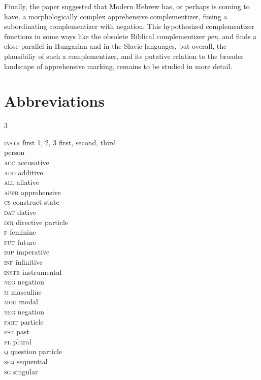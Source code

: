 \documentclass[output=paper,colorlinks,citecolor=brown]{langscibook}
\begin{document}
Finally, the paper suggested that Modern Hebrew has, or perhaps is coming to have, a morphologically complex apprehensive complementizer, fusing a subordinating complementizer with negation. This hypothesized complementizer functions in some ways like the obsolete Biblical complementizer \textit{pen}, and finds a close parallel in Hungarian and in the Slavic languages, but overall, the plausibiliy of such a complementizer, and its putative relation to the broader landscape of apprehensive marking, remains to be studied in more detail. 


\section*{Abbreviations}
\begin{multicols}{3}
\begin{tabbing}
\textsc{instr} \= first\kill
\textsc{1, 2, 3} \> first, second, third \\
\> person \\
\textsc{acc} \> accusative \\
\textsc{add} \> additive \\
\textsc{all} \> allative \\
\textsc{appr} \> apprehensive \\
\textsc{cs} \> construct state \\
\textsc{dat} \> dative \\
\textsc{dir} \> directive particle \\
\textsc{f}   \> feminine \\
\textsc{fut} \> future \\
\textsc{imp} \> imperative \\
\textsc{inf} \> infinitive \\
\textsc{instr} \> instrumental \\
\textsc{neg} \> negation \\
\textsc{m} \> masculine\\
\textsc{mod} \> modal \\
\textsc{neg} \> negation \\
\textsc{part} \> particle \\
\textsc{pst} \> past \\
\textsc{pl} \> plural \\
\textsc{q} \> question particle \\
\textsc{seq} \> sequential \\
\textsc{sg} \> singular 
\end{tabbing}
\end{multicols}
\end{document}
